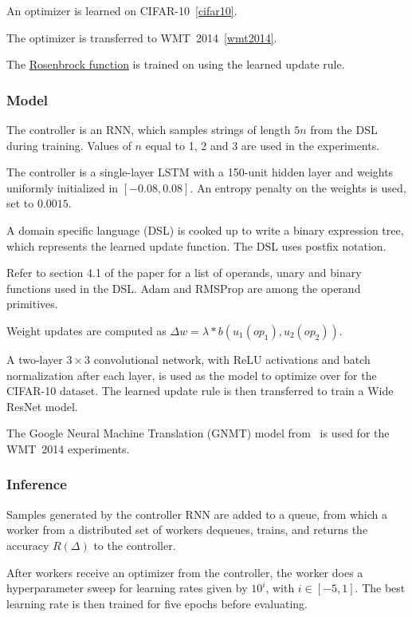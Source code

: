 \documentclass[a4paper, 12pt]{article}
\begin{document}
An optimizer is learned on CIFAR-10~\ref{cifar10}.

The optimizer is transferred to WMT~2014~\ref{wmt2014}.

The \href{https://en.wikipedia.org/wiki/Rosenbrock_function}{Rosenbrock
function} is trained on using the learned update rule.

\subsubsection{Model}


The controller is an RNN, which samples strings of length $5n$ from the DSL
during training. Values of $n$ equal to 1, 2 and 3 are used in the experiments.

The controller is a single-layer LSTM with a \num{150}-unit hidden layer and
weights uniformly initialized in $[-0.08, 0.08]$. An entropy penalty on the
weights is used, set to $0.0015$.

A domain specific language (DSL) is cooked up to write a binary expression
tree, which represents the learned update function. The DSL uses postfix
notation.

Refer to section 4.1 of the paper for a list of operands, unary and binary
functions used in the DSL\@. Adam and RMSProp are among the operand primitives.

Weight updates are computed as
$\Delta w = \lambda * b(u_1({op}_1), u_2({op}_2))$.

A two-layer $3 \times 3$ convolutional network, with ReLU activations and batch
normalization after each layer, is used as the model to optimize over for the
CIFAR-10 dataset. The learned update rule is then transferred to train a Wide
ResNet model.

The Google Neural Machine Translation (GNMT) model from~\citet{gnmt-45610} is
used for the WMT~2014 experiments.

\subsubsection{Inference}

Samples generated by the controller RNN are added to a queue, from which a
worker from a distributed set of workers dequeues, trains, and returns the
accuracy $R(\Delta)$ to the controller.

After workers receive an optimizer from the controller, the worker does a
hyperparameter sweep for learning rates given by $10^i$, with $i \in [-5, 1]$.
The best learning rate is then trained for five epochs before evaluating.
\end{document}
